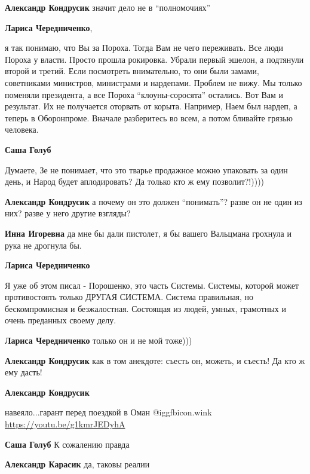 \begin{itemize}
\begin{itemize}
\textbf{Александр Кондрусик} значит дело не в \enquote{полномочиях}

\textbf{Лариса Чередниченко}, 

я так понимаю, что Вы за Пороха. Тогда Вам не чего переживать. Все люди Пороха
у власти. Просто прошла рокировка. Убрали первый эшелон, а подтянули второй и
третий. Если посмотреть внимательно, то они были замами, советниками министров,
министрами и нардепами. Проблем не вижу. Мы только поменяли президента, а все
Пороха \enquote{клоуны-соросята} остались. Вот Вам и результат. Их не получается
оторвать от корыта. Например, Наем был нардеп, а теперь в Оборонпроме. Вначале
разберитесь во всем, а потом бливайте грязью человека.


\textbf{Саша Голуб} 

Думаете, Зе не понимает, что это тварье продажное можно упаковать за один день,
и Народ будет аплодировать? Да только кто ж ему позволит?!))))

\textbf{Александр Кондрусик} а почему он это должен \enquote{понимать}? разве он не один из них? разве у него другие взгляды?

\textbf{Инна Игоревна} да мне бы дали пистолет, я бы вашего Вальцмана грохнула и рука не дрогнула бы.

\textbf{Лариса Чередниченко} 

Я уже об этом писал - Порошенко, это часть Системы. Системы, которой может
противостоять только ДРУГАЯ СИСТЕМА. Система правильная, но бескомпромисная и
безжалостная. Состоящая из людей, умных, грамотных и очень преданных своему
делу.

\textbf{Лариса Чередниченко} только он и не мой тоже)))

\textbf{Александр Кондрусик} как в том анекдоте: съесть он, можеть, и съесть! Да кто ж ему дасть!

\textbf{Александр Кондрусик} 

навеяло...гарант перед поездкой в Оман @igg{fbicon.wink} \url{https://youtu.be/g1kmrJEDyhA}

\textbf{Саша Голуб}
К сожалению правда

\textbf{Александр Карасик} да, таковы реалии

\end{itemize} %


\end{itemize}
